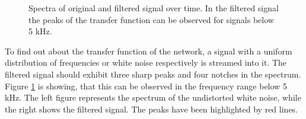 \documentclass[a4paper,twocolumn]{esapub2005} %
\begin{document}
\begin{figure}
	\centering
    \caption{
    Spectra of original and filtered signal over time.
    In the filtered signal the peaks of the transfer function can be observed for signals below 5 kHz.
    }
    \label{fig:prelim_results}
\end{figure}

To find out about the transfer function of the network,
a signal with a uniform distribution of frequencies or white noise respectively is streamed into it.
The filtered signal should exhibit three sharp peaks and four notches in the spectrum.
Figure \ref{fig:prelim_results} is showing, that this can be observed in the frequency range below 5 kHz.
The left figure represents the spectrum of the undistorted white noise, while the right shows the filtered signal.
The peaks have been highlighted by red lines.
\end{document}
